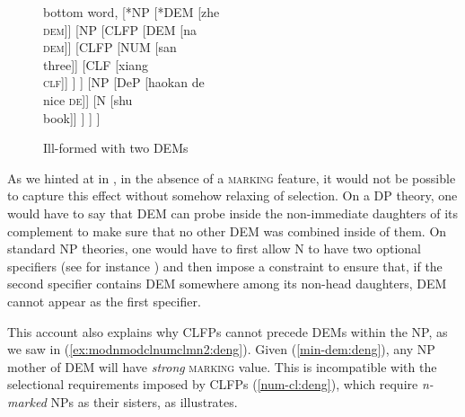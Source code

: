 \documentclass[output=paper,colorlinks,citecolor=brown]{langscibook}
\begin{document}
\begin{figure}
  \centering
		\begin{forest}
			bottom word,
	[*NP
		[*DEM [zhe \\ \textsc{dem}]]
		[NP
		[CLFP
			[DEM [na \\ \textsc{dem}]]
			[CLFP
				[NUM [san \\ three]]
			[CLF [xiang \\ \textsc{clf}]]
			]
		]	
			[NP
				[DeP [haokan de\\ nice \textsc{de}]]
				[N]
			]
		]
	]
		\end{forest}
  \caption{Ill-formed  with two DEMs}
  \label{fig:npwdems:deng} 
\end{figure}


As we hinted at in , in the absence of a \textsc{marking} feature, it would not be possible to capture this effect without somehow relaxing  of selection. On a DP theory, one would have to say that  DEM can probe inside the non-immediate daughters of its complement to make sure that no other DEM was combined inside of them. On standard NP theories, one would have to first allow N to have two optional specifiers (see for instance \citealt{Ng97}) and then impose a constraint to ensure that, if the second specifier contains DEM somewhere among its non-head daughters, DEM cannot appear as the first specifier. %

This account also explains why CLFPs cannot precede DEMs within the NP, as we saw in (\ref{ex:modnmodclnumclmn2:deng}).   Given (\ref{min-dem:deng}), any NP mother of DEM will have \textit{strong}  \textsc{marking} value. This is incompatible with the selectional requirements imposed by CLFPs  (\ref{num-cl:deng}), which require \textit{n-marked} NPs as their sisters, as  illustrates.


\end{document}
